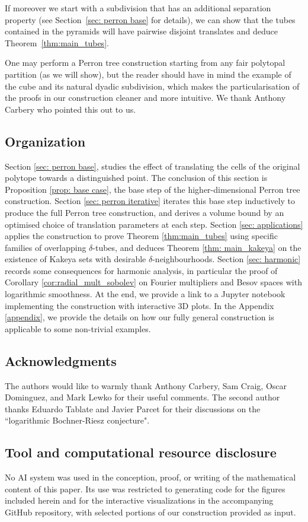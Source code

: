 \documentclass[10pt]{amsart}
\begin{document}
If moreover we start with a subdivision that has an additional separation property (see Section~\ref{sec: perron base} for details), we can show that the tubes contained in the pyramids will have pairwise disjoint translates and deduce Theorem~\ref{thm:main_tubes}.

One may perform a Perron tree construction starting from any fair polytopal partition (as we will show), but the reader should have in mind the example of the cube and its natural dyadic subdivision, which makes the particularisation of the proofs in our construction cleaner and more intuitive. We thank Anthony Carbery who pointed this out to us.
\subsection*{Organization}  
Section \ref{sec: perron base}, studies the effect of translating the cells of the original polytope towards a distinguished point. The conclusion of this section is Proposition \ref{prop: base case}, the base step of the higher-dimensional Perron tree construction. Section \ref{sec: perron iterative} iterates this base step inductively to produce the full Perron tree construction, and derives a volume bound by an optimised choice of translation parameters at each step. Section \ref{sec: applications} applies the construction to prove Theorem \ref{thm:main_tubes} using specific families of overlapping $\delta$-tubes, and deduces Theorem \ref{thm: main_kakeya} on the existence of Kakeya sets with desirable $\delta$-neighbourhoods. Section \ref{sec: harmonic} records some consequences for harmonic analysis, in particular the proof of Corollary \ref{cor:radial_mult_sobolev} on Fourier multipliers and Besov spaces with logarithmic smoothness. At the end, we provide a link to a Jupyter notebook implementing the construction with interactive $3$D plots. In the Appendix \ref{appendix}, we provide the details on how our fully general construction is applicable to some non-trivial examples.
\subsection*{Acknowledgments}
The authors would like to warmly thank Anthony Carbery, Sam Craig, Oscar Dominguez, and Mark Lewko for their useful comments. The second author thanks Eduardo Tablate and Javier Parcet for their discussions on the ``logarithmic Bochner-Riesz conjecture".

\subsection*{Tool and computational resource disclosure} No AI system was used in the conception, proof, or writing of the mathematical content of this paper. Its use was restricted to generating code for the figures included herein and for the interactive visualizations in the accompanying GitHub repository, with selected portions of our construction provided as input.
\end{document}
